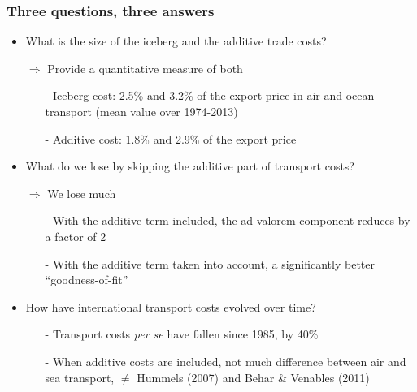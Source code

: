 \documentclass[10 pt,Helvetica, french]{beamer}
\begin{document}
\begin{frame}
\frametitle{Three questions, three answers}
\begin{itemize}
\item What is the size of the iceberg and the additive trade costs? \vspace{0.1cm}
\item[$\Rightarrow$] Provide a quantitative measure of both  \vspace{0.1cm}
\begin{itemize}
\item[-] Iceberg cost: 2.5\% and 3.2\% of the export price in air and ocean transport (mean value over 1974-2013) \vspace{0.1cm}
\item[-] Additive cost: 1.8\% and 2.9\% of the export price  \vspace{0.1cm}
\end{itemize}
\item What do we lose by skipping the additive part of transport costs? \vspace{0.1cm}
\item[$\Rightarrow$] We lose much \vspace{0.1cm}
\begin{itemize}
\item[-] With the additive term included, the ad-valorem component reduces by a factor of 2 \vspace{0.1cm}
\item[-] With the additive term taken into account, a significantly better ``goodness-of-fit'' \vspace{0.1cm}
\end{itemize}
\item How have international transport costs evolved over time? \vspace{0.1cm}
\begin{itemize}
\item[-] Transport costs \textit{per se} have fallen since 1985, by 40\% \vspace{0.1cm}
\item[-] When additive costs are included, not much difference between air and sea transport, $\neq$ Hummels (2007) and Behar \& Venables (2011)
\end{itemize}
\end{itemize}
\end{frame}
\end{document}

